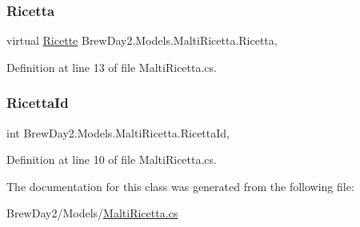 \subsubsection{\texorpdfstring{Ricetta}{Ricetta}}
{\footnotesize\ttfamily virtual \mbox{\hyperlink{class_brew_day2_1_1_models_1_1_ricette}{Ricette}} Brew\+Day2.\+Models.\+Malti\+Ricetta.\+Ricetta\hspace{0.3cm}{\ttfamily [get]}, {\ttfamily [set]}}



Definition at line 13 of file Malti\+Ricetta.\+cs.

\mbox{\label{class_brew_day2_1_1_models_1_1_malti_ricetta_a8e2e50c84d47cd087ceefe9906414128}} 
\subsubsection{\texorpdfstring{Ricetta\+Id}{RicettaId}}
{\footnotesize\ttfamily int Brew\+Day2.\+Models.\+Malti\+Ricetta.\+Ricetta\+Id\hspace{0.3cm}{\ttfamily [get]}, {\ttfamily [set]}}



Definition at line 10 of file Malti\+Ricetta.\+cs.



The documentation for this class was generated from the following file\+:\begin{DoxyCompactItemize}
\item 
Brew\+Day2/\+Models/\mbox{\hyperlink{_malti_ricetta_8cs}{Malti\+Ricetta.\+cs}}\end{DoxyCompactItemize}
